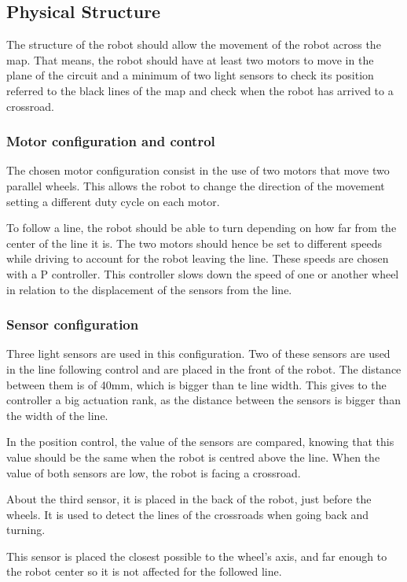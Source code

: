 \subsection{Physical Structure}
The structure of the robot should allow the movement of the robot across the map. 
That means, the robot should have at least two motors to move in the plane of the circuit and a minimum of two light sensors to check its position referred to the black lines of the map and check when the robot has arrived to a crossroad.

\subsubsection{Motor configuration and control}
The chosen motor configuration consist in the use of two motors that move two parallel wheels. 
This allows the robot to change the direction of the movement setting a different duty cycle on each motor.

To follow a line, the robot should be able to turn depending on how far from the center of the line it is.
The two motors should hence be set to different speeds while driving to account for the robot leaving the line.
These speeds are chosen with a P controller.
This controller slows down the speed of one or another wheel in relation to the displacement of the sensors from the line. 


\subsubsection{Sensor configuration}

Three light sensors are used in this configuration. 
Two of these sensors are used in the line following control and are placed in the front of the robot.
The distance between them is of 40mm, which is bigger than te line width.
This gives to the controller a big actuation rank, as the distance between the sensors is bigger than the width of the line.

In the position control, the value of the sensors are compared, knowing that this value should be the same when the robot is centred above the line.
When the value of both sensors are low, the robot is facing a crossroad.

About the third sensor, it is placed in the back of the robot, just before the wheels.
It is used to detect the lines of the crossroads when going back and turning.

This sensor is placed the closest possible to the wheel's axis, and far enough to the robot center so it is not affected
for the followed line.


